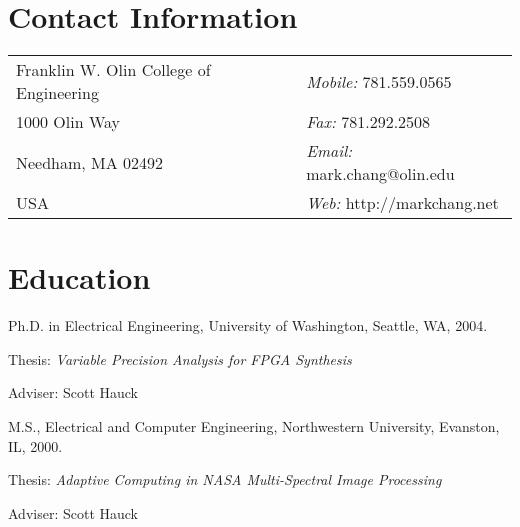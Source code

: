 \documentclass[line]{res}
\newenvironment{list1}{
  \begin{list}{\ding{113}}{%
      \setlength{\itemsep}{0in}
      \setlength{\parsep}{0in} \setlength{\parskip}{0in}
      \setlength{\topsep}{0in} \setlength{\partopsep}{0in} 
      \setlength{\leftmargin}{0.17in}}}{\end{list}}
\begin{document}

\begin{resume}
	
	\section{\sc Contact Information} \vspace{0.05in} 
	\begin{tabular}
		{@{}p{3in}p{2.5in}} Franklin W. Olin College of Engineering & {\em Mobile:} 781.559.0565 \\
		1000 Olin Way & {\em Fax:} 781.292.2508 \\
		Needham, MA 02492 & {\em Email:} mark.chang@olin.edu \\
		USA & {\em Web:} http://markchang.net \\
	\end{tabular}
	
	\section{\sc Education}
	\begin{enumerate}
		\item Ph.D. in Electrical Engineering, University of Washington, Seattle, WA, 2004.\\
		\vspace*{-.1in} 
		\begin{list1}
			\item[] Thesis: {\em Variable Precision Analysis for FPGA Synthesis} 
			\item[] Adviser: Scott Hauck 
		\end{list1}
		
		\item M.S., Electrical and Computer Engineering, Northwestern University, Evanston, IL, 2000.\\
		\vspace*{-.1in} 
		\begin{list1}
			\item[] Thesis: {\em Adaptive Computing in NASA Multi-Spectral Image Processing} 
			\item[] Adviser: Scott Hauck 
		\end{list1}
		

\end{enumerate}
\end{resume}
\end{document}
